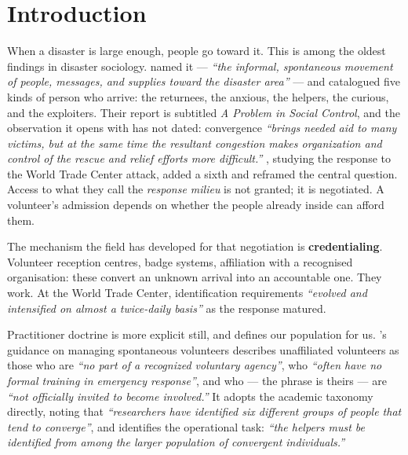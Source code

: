 
\section{Introduction}

When a disaster is large enough, people go toward it. This is among the
oldest findings in disaster sociology. \citet{fritz1957} named it --- \emph{``the informal, spontaneous movement of people, messages,
and supplies toward the disaster area''} --- and catalogued five kinds
of person who arrive: the returnees, the anxious, the helpers, the
curious, and the exploiters. Their report is subtitled \emph{A Problem
in Social Control}, and the observation it opens with has not dated:
convergence \emph{``brings needed aid to many victims, but at the same
time the resultant congestion makes organization and control of the
rescue and relief efforts more difficult.''} \citet{kendra2002}, studying the response to the World Trade Center attack, added a
sixth and reframed the central question. Access to what they call the
\emph{response milieu} is not granted; it is negotiated. A volunteer's
admission depends on whether the people already inside can afford them.

The mechanism the field has developed for that negotiation is
\textbf{credentialing}. Volunteer reception centres, badge systems,
affiliation with a recognised organisation: these convert an unknown
arrival into an accountable one. They work. At the World Trade Center,
identification requirements \emph{``evolved and intensified on almost a
twice-daily basis''} as the response matured.

Practitioner doctrine is more explicit still, and defines our population
for us. \citeauthor{fema_msv}'s guidance on managing spontaneous volunteers \citeyearpar{fema_msv} describes
unaffiliated volunteers as those who are \emph{``no part of a recognized
voluntary agency''}, who \emph{``often have no formal training in
emergency response''}, and who --- the phrase is theirs --- are
\emph{``not officially invited to become involved.''} It adopts the
academic taxonomy directly, noting that \emph{``researchers have
identified six different groups of people that tend to converge''}, and
identifies the operational task: \emph{``the helpers must be identified
from among the larger population of convergent individuals.''}

